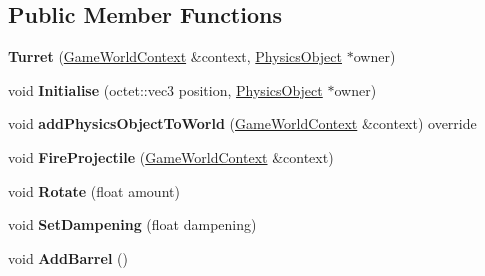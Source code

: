 \subsection*{Public Member Functions}
\begin{DoxyCompactItemize}
\item 
\hypertarget{class_arena_1_1_turret_a84a564460e55587bffc4ba085ba4e00e}{{\bfseries Turret} (\hyperlink{struct_arena_1_1_game_world_context}{Game\+World\+Context} \&context, \hyperlink{class_arena_1_1_physics_object}{Physics\+Object} $\ast$owner)}\label{class_arena_1_1_turret_a84a564460e55587bffc4ba085ba4e00e}

\item 
\hypertarget{class_arena_1_1_turret_a54b175dfcfacc445f533408b58ff5a11}{void {\bfseries Initialise} (octet\+::vec3 position, \hyperlink{class_arena_1_1_physics_object}{Physics\+Object} $\ast$owner)}\label{class_arena_1_1_turret_a54b175dfcfacc445f533408b58ff5a11}

\item 
\hypertarget{class_arena_1_1_turret_aebf826e8f5dacf6c72843f75b1b0ef92}{void {\bfseries add\+Physics\+Object\+To\+World} (\hyperlink{struct_arena_1_1_game_world_context}{Game\+World\+Context} \&context) override}\label{class_arena_1_1_turret_aebf826e8f5dacf6c72843f75b1b0ef92}

\item 
\hypertarget{class_arena_1_1_turret_ad4700360e5412eea4ec4189a73ea3a3c}{void {\bfseries Fire\+Projectile} (\hyperlink{struct_arena_1_1_game_world_context}{Game\+World\+Context} \&context)}\label{class_arena_1_1_turret_ad4700360e5412eea4ec4189a73ea3a3c}

\item 
\hypertarget{class_arena_1_1_turret_a3166a715e0b3c243e8c7de8b71bd793b}{void {\bfseries Rotate} (float amount)}\label{class_arena_1_1_turret_a3166a715e0b3c243e8c7de8b71bd793b}

\item 
\hypertarget{class_arena_1_1_turret_a66102f8ba3e180ce587a21e52f2c9433}{void {\bfseries Set\+Dampening} (float dampening)}\label{class_arena_1_1_turret_a66102f8ba3e180ce587a21e52f2c9433}

\item 
\hypertarget{class_arena_1_1_turret_a8459459dd29f8e7cb9299c3e7d20218a}{void {\bfseries Add\+Barrel} ()}\label{class_arena_1_1_turret_a8459459dd29f8e7cb9299c3e7d20218a}

\end{DoxyCompactItemize}
